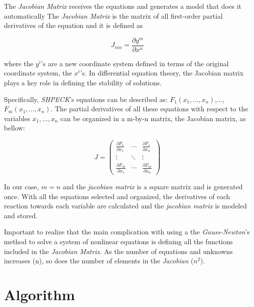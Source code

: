 \documentclass[ppgc,mestrado,English]{iiufrgs}
\begin{document}
The \emph{Jacobian Matrix} receives the equations and generates a model that does it automatically The \emph{Jacobian Matrix} is the matrix of all first-order partial derivatives of the equation and it is defined as

\begin{equation}
\label{eq:JacobianDefinition}
J_{mn} = \frac{\partial y^m}{\partial x^n}
\end{equation}

where the $y^i$'s are a new coordinate system defined in terms of the original coordinate system, the $x^i$'s. In differential equation theory, the Jacobian matrix plays a key role in defining the stability of solutions.

Specifically, \emph{SHPECK}'s equations can be described as: $F_1(x_1,..., x_n)$,...,$F_m(x_1,...,x_n)$. The partial derivatives of all these equations with respect to the variables $x_1,...,x_n$ can be organized in a m-by-n matrix, the Jacobian matrix, as bellow:

\begin{equation} 
J =
 \begin{pmatrix}
  \frac{\partial F_1}{\partial x_1} & \cdots & \frac{\partial F_1}{\partial x_n} \\
  \vdots  & \ddots & \vdots  \\
  \frac{\partial F_m}{\partial x_1} & \cdots &   \frac{\partial F_m}{\partial x_n}
 \end{pmatrix}
\end{equation}

In our case, $m = n$ and the \emph{jacobian matrix} is a square matrix and is generated once. With all the equations selected and organized, the derivatives of each reaction towards each variable are calculated and the \emph{jacobian matrix} is modeled and stored. 

Important to realize that the main complication with using a the \emph{Gauss-Newton}'s method to solve a system of nonlinear equations is defining all the functions included in the \emph{Jacobian Matrix}. As the number of equations and unknowns increases (n), so does the number of elements in the \emph{Jacobian} ($n^2$).

\section{Algorithm}
\end{document}
